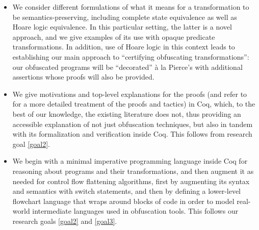 \documentclass[compsoc,conference,a4paper,10pt,times]{IEEEtran}
\begin{document}
\begin{itemize}
    \item We consider different formulations of what it means for a transformation to be semantics-preserving, including complete state equivalence as well as Hoare logic equivalence. In this particular setting, the latter is a novel approach, and we give examples of its use with opaque predicate transformations. In addition, use of Hoare logic in this context leads to establishing our main approach to ``certifying obfuscating transformations'': our obfuscated programs will be ``decorated''  \`a la  Pierce's \cite{SFV2} with additional assertions whose proofs will also be provided.\label{itm:1}
    \item We give motivations and top-level explanations for the proofs (and refer to \cite{Weyun} for a more detailed treatment of the proofs and tactics) in Coq, which, to the best of our knowledge, the existing literature does not, thus providing an accessible explanation of not just obfuscation techniques, but also in tandem with its formalization and verification inside Coq. This follows from research goal \ref{goal2}.\label{itm:2}
    \item We begin with a minimal imperative programming language inside Coq for reasoning about programs and their transformations, and then augment it as needed for control flow flattening algorithms, first by augmenting its syntax and semantics with switch statements, and then by defining a lower-level flowchart language that wraps around blocks of code in order to model real-world intermediate languages used in obfuscation tools. This follows our research goals \ref{goal2} and \ref{goal3}. \label{itm:3}
\end{itemize}



\end{document}
